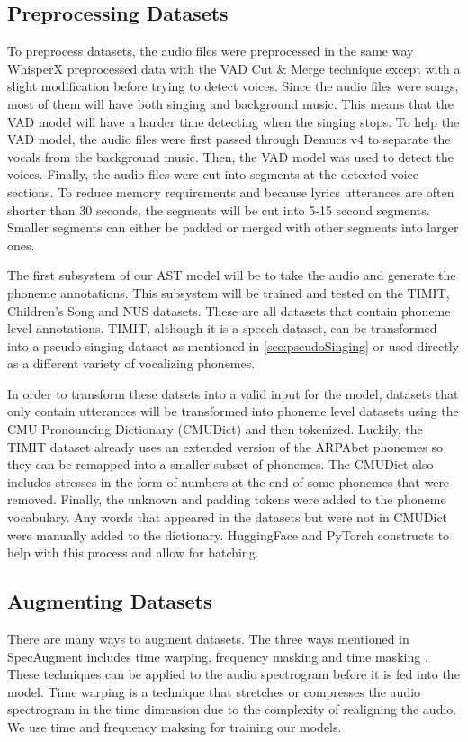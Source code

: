\documentclass[letterpaper, 12pt]{article}
\begin{document}
\begin{multicols*}{2}
\subsection{Preprocessing Datasets}
To preprocess datasets, the audio files were preprocessed in the same way WhisperX preprocessed
data with the VAD Cut \& Merge technique \citep{whisperX} except with a slight modification before
trying to detect voices. Since the audio files were songs, most of them will have both singing and
background music. This means that the VAD model will have a harder time detecting when the singing
stops. To help the VAD model, the audio files were first passed through Demucs v4 \citep{Demucs}
to separate the vocals from the background music. Then, the VAD model was used to detect the
voices. Finally, the audio files were cut into segments at the detected voice sections. To reduce
memory requirements and because lyrics utterances are often shorter than 30 seconds, the segments
will be cut into 5-15 second segments. Smaller segments can either be padded
or merged with other segments into larger ones.

The first subsystem of our AST model will be to take the audio and generate the phoneme annotations.
This subsystem will be trained and tested on the TIMIT, Children's Song and NUS datasets. These are
all datasets that contain phoneme level annotations. TIMIT, although it is a speech dataset, can be
transformed into a pseudo-singing dataset as mentioned in \ref{sec:pseudoSinging} or used directly
as a different variety of vocalizing phonemes.

In order to transform these datsets into a valid input for the model, datasets that only contain
utterances will be transformed into phoneme level datasets using the CMU Pronouncing Dictionary
(CMUDict) and then tokenized. Luckily, the TIMIT dataset already uses an extended version of the
ARPAbet phonemes so they can be remapped into a smaller subset of phonemes. The CMUDict also
includes stresses in the form of numbers at the end of some phonemes that were removed. Finally,
the unknown and padding tokens were added to the phoneme vocabulary. Any words that appeared in
the datasets but were not in CMUDict were manually added to the dictionary. HuggingFace and PyTorch
constructs to help with this process and allow for batching.

\subsection{Augmenting Datasets}
There are many ways to augment datasets. The three ways mentioned in SpecAugment includes
time warping, frequency masking and time masking \citep{SpecAugment}. These techniques can be
applied to the audio spectrogram before it is fed into the model. Time warping is a technique that
stretches or compresses the audio spectrogram in the time dimension due to the complexity of
realigning the audio. We use time and frequency maksing for training our models.


\end{multicols*}
\end{document}
